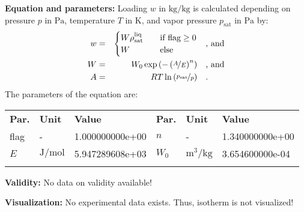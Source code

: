 \textbf{Equation and parameters:}
\newline
%
Loading $w$ in $\si{\kilogram\per\kilogram}$ is calculated depending on pressure $p$ in $\si{\pascal}$, temperature $T$ in $\si{\kelvin}$, and vapor pressure $p_\mathrm{sat}$ in $\si{\pascal}$ by:
%
\begin{equation*}
\begin{split}
w &=& \begin{cases} W \rho_\mathrm{sat}^{\mathrm{liq}} & \quad \text{if flag} \geq 0 \\ W & \quad \text{else} \end{cases} & \quad\text{, and} \\
W &=& W_0 \exp \left( - \left( \nicefrac{A}{E} \right) ^{n} \right) & \quad\text{, and} \\
A &=& R T \ln \left( \nicefrac{p_\mathrm{sat}}{p} \right) & \quad\text{.} \\
\end{split}
\end{equation*}
%
The parameters of the equation are:
%
\begin{longtable}[l]{lll|lll}
\toprule
\addlinespace
\textbf{Par.} & \textbf{Unit} & \textbf{Value} &	\textbf{Par.} & \textbf{Unit} & \textbf{Value} \\
\addlinespace
\midrule
\endhead

\bottomrule
\endfoot
\bottomrule
\endlastfoot
\addlinespace

flag & - & 1.000000000e+00 & $n$ & - & 1.340000000e+00 \\
$E$ & $\si{\joule\per\mole}$ & 5.947289608e+03 & $W_0$ & $\si{\cubic\meter\per\kilogram}$ & 3.654600000e-04 \\

\addlinespace\end{longtable}

\textbf{Validity:}
\newline
No data on validity available!
\newline

\textbf{Visualization:}
%
\newline
No experimental data exists. Thus, isotherm is not visualized!
%

\FloatBarrier
\newpage
